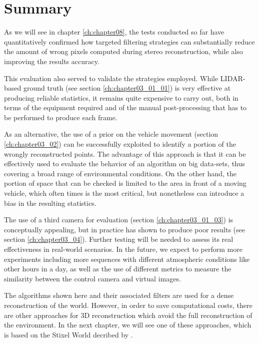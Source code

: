 \section{Summary}\label{ch:chapter03_05}

As we will see in chapter \ref{ch:chapter08}, the tests conducted so far have quantitatively confirmed how targeted filtering strategies can substantially reduce the amount of wrong pixels computed during stereo reconstruction, while also improving the results accuracy.

This evaluation also served to validate the strategies employed. While LIDAR-based ground truth (see section \ref{ch:chapter03_01_01}) is very effective at producing reliable statistics, it remains quite expensive to carry out, both in terms of the equipment required and of the manual post-processing that has to be performed to produce each frame.

As an alternative, the use of a prior on the vehicle movement (section \ref{ch:chapter03_02}) can be successfully exploited to identify a portion of the wrongly reconstructed points. The advantage of this approach is that it can be effectively used to evaluate the behavior of an algorithm on big data-sets, thus covering a broad range of environmental conditions. On the other hand, the portion of space that can be checked is limited to the area in front of a moving vehicle, which often times is the most critical, but nonetheless can introduce a bias in the resulting statistics.

The use of a third camera for evaluation (section \ref{ch:chapter03_01_03}) is conceptually appealing, but in practice has shown to produce poor results (see section \ref{ch:chapter03_04}). Further testing will be needed to assess its real effectiveness in real-world scenarios. In the future, we expect to perform more experiments including more sequences with different atmospheric conditions like other hours in a day, as well as the use of different metrics to measure the similarity between the control camera and virtual images.

The algorithms shown here and their associated filters are used for a dense reconstruction of the world. However, in order to save computational costs, there are other approaches for 3D reconstruction which avoid the full reconstruction of the environment. In the next chapter, we will see one of these approaches, which is based on the Stixel World decribed by \cite{badino2009stixel}.
